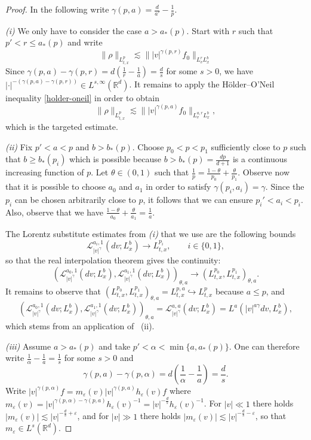 \documentclass[11pt,a4paper,reqno]{amsart}
\theoremstyle{plain}
\theoremstyle{remark}
\begin{document}
\begin{proof} 
In the following write $\gamma(p,a)=\frac{d}{a'}-\frac{1}{p}$.

\medskip
\noindent \textit{(i)} We only have to consider the case $a>a_*(p)$. Start with $r$ such that $p'<r \leq a_*(p)$ and write 
\[
    \|\rho\|_{L^p_{t,x}} \lesssim \||v|^{\gamma(p,r)}f_0\|_{L^r_vL^{b}_{x}}
\]
Since $\gamma(p,a)-\gamma(p,r)=d\left(\frac{1}{r}-\frac{1}{a}\right) = \frac{d}{s}$ for some $s>0$, we have $|\cdot|^{-(\gamma(p,a)-\gamma(p,r))} \in L^{s,\infty}(\mathbb{R}^d)$. 
It remains to apply the Hölder--O'Neil inequality \eqref{holder-oneil} in order to obtain
\[
    \|\rho\|_{L^p_{t,x}} \lesssim \||v|^{\gamma(p,a)}f_0\|_{L^{a,r}_vL^b_x},
\]
which is the targeted estimate.

\medskip 
\noindent \textit{(ii)} 
Fix $p'<a<p$ and $b>b_*(p)$. Choose $p_0<p<p_1$ sufficiently close to $p$ such that $ b\ge b_*(p_i)$ which is possible because $b>b_*(p)=\frac{dp}{d+1}$ is a continuous increasing function of $p$. Let $\theta\in(0,1)$ such that $\frac{1}{p}=\frac{1-\theta}{p_0}+\frac{\theta}{p_1}$. Observe now that it is possible to choose $a_0$ and $a_1$ in order to satisfy $\gamma(p_i,a_i)=\gamma$. Since the $p_i$ can be chosen arbitrarily close to $p$, it follows that we can ensure $p_i'<a_i<p_i$. Also, observe that we have $\frac{1-\theta}{a_0} + \frac{\theta}{a_1} = \frac{1}{a}$.

The Lorentz substitute estimates from \textit{(i)} that we use are the following bounds 
\[
    \mathcal{L}^{a_i,1}_{|v|^{\gamma}}(dv;L^b_x) \longrightarrow L^{p_i}_{t,x}, \qquad i \in \{0, 1 \},
\]
so that the real interpolation theorem gives the continuity: 
\[
    \left( \mathcal{L}^{a_0,1}_{|v|^{\gamma}}(dv;L^b_x), \mathcal{L}^{a_1,1}_{|v|^{\gamma}}(dv;L^b_x) \right)_{\theta,a} \longrightarrow (L^{p_0}_{t,x},L^{p_1}_{t,x})_{\theta,a}.
\]
It remains to observe that $(L^{p_0}_{t,x},L^{p_1}_{t,x})_{\theta,a}=L^{p,a}_{t,x} \hookrightarrow L^p_{t,x}$ because $a \leq p$, and 
\[ 
    \left( \mathcal{L}^{a_0,1}_{|v|^{\gamma}}(dv;L^b_x), \mathcal{L}^{a_1,1}_{|v|^{\gamma}}(dv;L^b_x) \right)_{\theta,a} = \mathcal{L}^{a,a}_{|v|^{\gamma}}(dv;L^b_x)=L^a(|v|^{a\gamma}dv,L^b_x),
\]
which stems from an application of ~(ii). 

\medskip
\noindent\textit{(iii)} Assume $a>a_*(p)$ and take $p'<\alpha< \min\{a,a_*(p)\}$. One can therefore write $\frac{1}{\alpha}-\frac{1}{a}=\frac{1}{s}$ for some $s>0$ and 
\[
    \gamma(p,a)-\gamma(p,\alpha) =d\left(\frac{1}{\alpha}-\frac{1}{a}\right) =\frac{d}{s}.
\]
Write $|v|^{\gamma(p,\alpha)}f = m_{\varepsilon}(v)|v|^{\gamma(p,a)}h_{\varepsilon}(v)f$ where $m_{\varepsilon}(v)=|v|^{\gamma(p,\alpha)-\gamma(p,a)}h_{\varepsilon}(v)^{-1}=|v|^{-\frac{d}{s}}h_{\varepsilon}(v)^{-1}$. For $|v|\ll 1$ there holds $|m_{\varepsilon}(v)| \lesssim |v|^{-\frac{d}{s}+\varepsilon}$, and for $|v| \gg 1$ there holds $|m_{\varepsilon}(v)| \lesssim |v|^{-\frac{d}{s}-\varepsilon}$, so that $m_{\varepsilon}\in L^s(\mathbb{R}^d)$. 


\end{proof}
\end{document}
